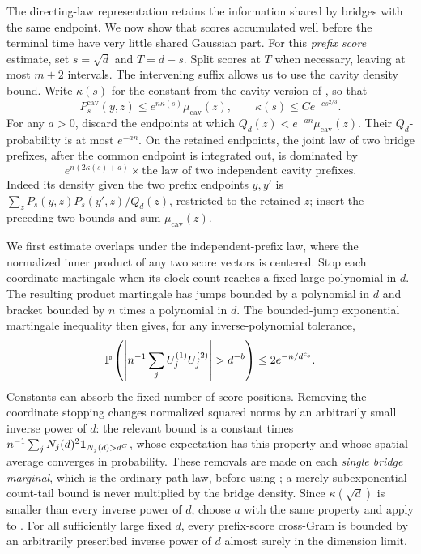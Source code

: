 The directing-law representation retains the information shared by
bridges with the same endpoint. We now show that scores accumulated
well before the terminal time have very little shared Gaussian part.  For this \emph{prefix score}
estimate, set $s=\sqrt d$ and $T=d-s$.  Split scores at $T$ when
necessary, leaving at most $m+2$ intervals.  The intervening suffix
allows us to use the cavity density bound.  Write $\kappa(s)$ for the
constant from the cavity version of , so that
\[
 P_s^{\mathrm{cav}}(y,z)\le e^{n\kappa(s)}\mu_{\mathrm{cav}}(z),
 \qquad \kappa(s)\le C e^{-c s^{2/3}}.
\]
For any $a>0$, discard the endpoints at which
$Q_d(z)<e^{-an}\mu_{\mathrm{cav}}(z)$.  Their $Q_d$-probability is at
most $e^{-an}$.  On the retained endpoints, the joint law of two bridge
prefixes, after the common endpoint is integrated out, is dominated by
\begin{equation}
 e^{n(2\kappa(s)+a)}
       \times\text{the law of two independent cavity prefixes}.
 \label{eq:row-bridge-domination}
\end{equation}
Indeed its density given the two prefix endpoints $y,y'$ is
$\sum_zP_s(y,z)P_s(y',z)/Q_d(z)$, restricted to the retained $z$;
insert the preceding two bounds and sum $\mu_{\mathrm{cav}}(z)$.

We first estimate overlaps under the independent-prefix law, where the
normalized inner product of any two score vectors is centered.  Stop
each coordinate martingale when its clock count reaches a fixed large
polynomial in $d$.  The resulting product martingale has jumps bounded
by a polynomial in $d$ and bracket bounded by $n$ times a polynomial in
$d$.  The bounded-jump exponential martingale inequality then gives,
for any inverse-polynomial tolerance,
\begin{equation}
 \P\left(\left|n^{-1}\sum_j
        U_j^{(1)}U_j^{(2)}\right|>d^{-b}\right)
           \le 2e^{-n/d^{c_b}}.
 \label{eq:row-independent-overlap}
\end{equation}
Constants can absorb the fixed number of score positions.  Removing
the coordinate stopping changes normalized squared norms by an
arbitrarily small inverse power of $d$: the relevant bound is a
constant times $n^{-1}\sum_j N_j(d)^2\mathbf 1_{N_j(d)>d^C}$, whose expectation
has this property and whose spatial average converges in probability.
These removals are made on each \emph{single bridge marginal}, which
is the ordinary path law, before using
; a merely subexponential count-tail
bound is never multiplied by the bridge density.
Since $\kappa(\sqrt d)$ is smaller than every inverse power of $d$,
choose $a$ with the same property and apply
 to
.  For all sufficiently large fixed
$d$, every prefix-score cross-Gram is bounded by an arbitrarily
prescribed inverse power of $d$ almost surely in the dimension limit.

